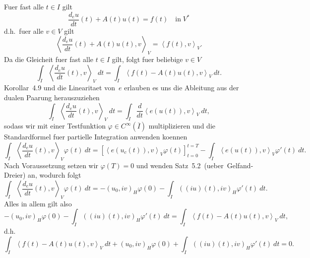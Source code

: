 \documentclass{article}
\begin{document}
Fuer fast alle $t \in I$ gilt
\begin{equation*}
  \frac{d_e u}{dt}(t) + A(t) u(t) 
  = f(t) \quad \text{in} \; V^*
\end{equation*}
d.h.\ fuer alle $v \in V$ gilt
\begin{equation*}
  {\left\langle \frac{d_e u}{dt}(t) + A(t) u(t), v \right\rangle}_V
  =  {\left\langle f(t), v \right\rangle}_V.
\end{equation*}
Da die Gleicheit fuer fast alle $t \in I$ gilt, folgt fuer beliebige $v \in V$
\begin{equation*}
  \int_{I} {\left\langle \frac{d_e u}{dt}(t), v \right\rangle}_V \ dt
  =  \int_{I} {\left\langle f(t) - A(t) u(t), v \right\rangle}_V \ dt.
\end{equation*}
Korollar~4.9 und die Linearitaet von~$e$ erlauben es uns die Ableitung aus der dualen Paarung herauszuziehen
\begin{equation*}
  \int_{I} {\left\langle \frac{d_e u}{dt}(t), v \right\rangle}_V \ dt
  = \int_{I} \frac{d}{dt} {\left\langle e(u(t)), v \right\rangle}_V \ dt,
\end{equation*}
sodass wir mit einer Testfunktion $\varphi \in C^\infty(\overline{I})$ multiplizieren und die Standardformel fuer partielle Integration anwenden koennen
\begin{equation*}
  \int_{I} {\left\langle \frac{d_e u}{dt}(t), v \right\rangle}_V \varphi(t) \ dt
  = {\left[ {\left\langle e(u_c(t)), v \right\rangle}_V \varphi(t) \right]}_{t=0}^{t = T}
  - \int_{I} {\left\langle e(u(t)), v \right\rangle}_V \varphi'(t) \ dt.
\end{equation*}
Nach Voraussetzung setzen wir $\varphi(T) = 0$ und wenden Satz~5.2~(ueber~Gelfand-Dreier) an, wodurch folgt
\begin{equation*}
  \int_{I} {\left\langle \frac{d_e u}{dt}(t), v \right\rangle}_V \varphi(t) \ dt
  = - {(u_0, iv)}_H \varphi(0)
  - \int_{I} {((iu)(t), iv)}_H \varphi'(t) \ dt.
\end{equation*}
Alles in allem gilt also
\begin{equation*}
  - {(u_0, iv)}_H \varphi(0)
  - \int_{I} {((iu)(t), iv)}_H \varphi'(t) \ dt
  = \int_{I} {\left\langle f(t) - A(t) u(t), v \right\rangle}_V \ dt,
\end{equation*}
d.h.
\begin{equation*}
  \int_{I} {\left\langle f(t) - A(t) u(t), v \right\rangle}_V \ dt
  + {(u_0, iv)}_H \varphi(0)
  + \int_{I} {((iu)(t), iv)}_H \varphi'(t) \ dt
  = 0.
\end{equation*}
\end{document}
